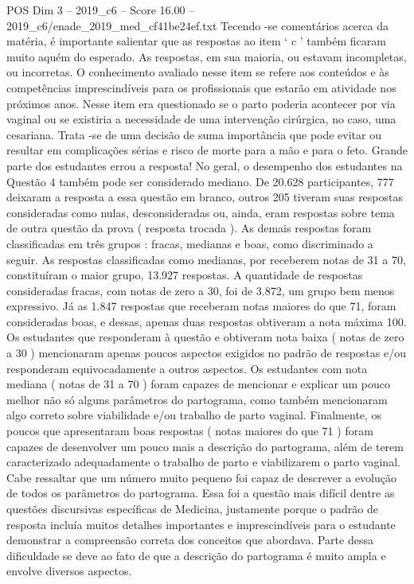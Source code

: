 \begin{textsample}{POS Dim 3 – 2019\_c6 – Score 16.00 – 2019\_c6/enade\_2019\_med\_cf41be24ef.txt}
Tecendo -se comentários acerca da matéria, é importante salientar que as respostas ao item ‘ c ’ também ficaram muito aquém do esperado.
As respostas, em sua maioria, ou estavam incompletas, ou incorretas.
O conhecimento avaliado nesse item se refere aos conteúdos e às competências imprescindíveis para os profissionais que estarão em atividade nos próximos anos.
Nesse item era questionado se o parto poderia acontecer por via vaginal ou se existiria a necessidade de uma intervenção cirúrgica, no caso, uma cesariana.
Trata -se de uma decisão de suma importância que pode evitar ou resultar em complicações sérias e risco de morte para a mão e para o feto.
Grande parte dos estudantes errou a resposta!
No geral, o desempenho dos estudantes na Questão 4 também pode ser considerado mediano.
De 20.628 participantes, 777 deixaram a resposta a essa questão em branco, outros 205 tiveram suas respostas consideradas como nulas, desconsideradas ou, ainda, eram respostas sobre tema de outra questão da prova ( resposta trocada ).
As demais respostas foram classificadas em três grupos : fracas, medianas e boas, como discriminado a seguir.
As respostas classificadas como medianas, por receberem notas de 31 a 70, constituíram o maior grupo, 13.927 respostas.
A quantidade de respostas consideradas fracas, com notas de zero a 30, foi de 3.872, um grupo bem menos expressivo.
Já as 1.847 respostas que receberam notas maiores do que 71, foram consideradas boas, e dessas, apenas duas respostas obtiveram a nota máxima 100.
Os estudantes que responderam à questão e obtiveram nota baixa ( notas de zero a 30 ) mencionaram apenas poucos aspectos exigidos no padrão de respostas e/ou responderam equivocadamente a outros aspectos.
Os estudantes com nota mediana ( notas de 31 a 70 ) foram capazes de mencionar e explicar um pouco melhor não só alguns parâmetros do partograma, como também mencionaram algo correto sobre viabilidade e/ou trabalho de parto vaginal.
Finalmente, os poucos que apresentaram boas respostas ( notas maiores do que 71 ) foram capazes de desenvolver um pouco mais a descrição do partograma, além de terem caracterizado adequadamente o trabalho de parto e viabilizarem o parto vaginal.
Cabe ressaltar que um número muito pequeno foi capaz de descrever a evolução de todos os parâmetros do partograma.
Essa foi a questão mais difícil dentre as questões discursivas específicas de Medicina, justamente porque o padrão de resposta incluía muitos detalhes importantes e imprescindíveis para o estudante demonstrar a compreensão correta dos conceitos que abordava.
Parte dessa dificuldade se deve ao fato de que a descrição do partograma é muito ampla e envolve diversos aspectos.

\end{textsample}
